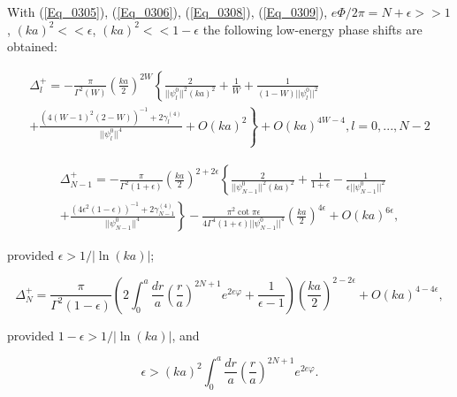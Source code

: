 \documentclass[a4paper,twocolumn,showpacs,preprintnumbers,amsmath,amssymb]{revtex4}
\begin{document}
\noindent
With (\ref{Eq_0305}), (\ref{Eq_0306}), (\ref{Eq_0308}),
(\ref{Eq_0309}), $e\Phi/2\pi = N + \epsilon >> 1$,
$(ka)^2 << \epsilon$, $(ka)^2 << 1 - \epsilon$ the following
low-energy phase shifts are obtained:

\begin{widetext}
\begin{multline}
\label{Eq_0311}
\Delta^{+}_l
  = - \frac{\pi}{\Gamma^2(W)} \left(\frac{ka}{2}\right)^{2W}
    \left\{
    \frac{2}{||\psi^0_l||^2 (ka)^2} + \frac{1}{W}
    + \frac{1}{(1-W) ||\psi^0_l||^2}\right.\\[3mm]
    \left.
    + \frac{(4 (W-1)^2 (2-W) )^{-1} + 2 \gamma^{(4)}_l}
           {||\psi^0_l||^4}
    + O(ka)^2
    \right\}
    + O(ka)^{4W-4}, l = 0, ..., N-2
\end{multline}

\begin{multline}
\label{Eq_0312}
\Delta^{+}_{N-1}
  = - \frac{\pi}{\Gamma^2 (1 + \epsilon)}
    \left(\frac{ka}{2}\right)^{2 + 2\epsilon}
    \left\{
    \frac{2}{||\psi^0_{N-1}||^2 (ka)^2} + \frac{1}{1 + \epsilon}
    - \frac{1}{\epsilon||\psi^0_{N-1}||^2}\right.\\[3mm]
    \left.
    + \frac{(4 \epsilon^2 (1-\epsilon) )^{-1} + 2 \gamma^{(4)}_{N-1}}
           {||\psi^0_{N-1}||^4}
    \right\}
    - \frac{\pi^2 \cot \pi \epsilon}
           {4 \Gamma^4 (1 + \epsilon)||\psi^0_{N-1}||^4}
    \left(\frac{ka}{2}\right)^{4\epsilon}
    + O(ka)^{6 \epsilon}, 
\end{multline}
\end{widetext}

\noindent
provided $\epsilon > 1 / |\ln (ka)|$;

\begin{widetext}
\begin{equation}
\label{Eq_0313}
\Delta^{+}_N
  = \frac{\pi}{\Gamma^2(1-\epsilon)}
    \left( 2 \int^a_0 \frac{dr}{a} \left(\frac{r}{a}\right)^{2N+1}
    e^{2 e \varphi} + \frac{1}{\epsilon - 1}\right)
    \left(\frac{ka}{2}\right)^{2 - 2\epsilon}
    + O(ka)^{4-4\epsilon},
\end{equation}
\end{widetext}

\noindent
provided $1 - \epsilon > 1 / |\ln(ka)|$, and

\begin{equation}
\label{Eq_0314}
\epsilon > (ka)^2 \int^a_0 \frac{dr}{a}
  \left(\frac{r}{a}\right)^{2N+1} e^{2e \varphi}.
\end{equation}
\end{document}
